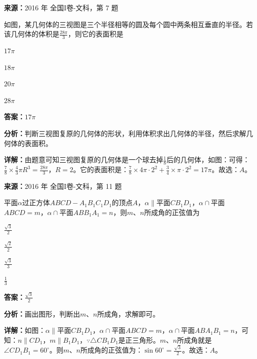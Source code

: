 \begin{question}[points=5]
\textbf{来源：}2016 年 全国I卷-文科，第 7 题\par
如图，某几何体的三视图是三个半径相等的圆及每个圆中两条相互垂直的半径。若该几何体的体积是$\frac{28\pi}{3}$，则它的表面积是
\begin{choices}
  \item $17\pi$
  \item $18\pi$
  \item $20\pi$
  \item $28\pi$
\end{choices}
\begin{solution}
\textbf{答案：}$17\pi$

\textbf{分析：}判断三视图复原的几何体的形状，利用体积求出几何体的半径，然后求解几何体的表面积。

\textbf{详解：}由题意可知三视图复原的几何体是一个球去掉$\frac{1}{8}$后的几何体，如图：可得：$\frac{7}{8}\times\frac{4}{3}\pi R^3=\frac{28\pi}{3}$，$R=2$。它的表面积是：$\frac{7}{8}\times4\pi\cdot2^2+\frac{3}{4}\times\pi\cdot2^2=17\pi$。故选：$A$。
\end{solution}
\end{question}

\begin{question}[points=5]
\textbf{来源：}2016 年 全国I卷-文科，第 11 题\par
平面$\alpha$过正方体$ABCD-A_1B_1C_1D_1$的顶点$A$，$\alpha\parallel$平面$CB_1D_1$，$\alpha\cap$平面$ABCD=m$，$\alpha\cap$平面$ABB_1A_1=n$，则$m$、$n$所成角的正弦值为
\begin{choices}
  \item $\frac{\sqrt{3}}{2}$
  \item $\frac{\sqrt{2}}{2}$
  \item $\frac{\sqrt{3}}{3}$
  \item $\frac{1}{3}$
\end{choices}
\begin{solution}
\textbf{答案：}$\frac{\sqrt{3}}{2}$

\textbf{分析：}画出图形，判断出$m$、$n$所成角，求解即可。

\textbf{详解：}如图：$\alpha\parallel$平面$CB_1D_1$，$\alpha\cap$平面$ABCD=m$，$\alpha\cap$平面$ABA_1B_1=n$，可知：$n\parallel CD_1$，$m\parallel B_1D_1$，$\because \triangle CB_1D_1$是正三角形。$m$、$n$所成角就是$\angle CD_1B_1=60^\circ$。则$m$、$n$所成角的正弦值为：$\sin60^\circ=\frac{\sqrt{3}}{2}$。故选：$A$。
\end{solution}
\end{question}

